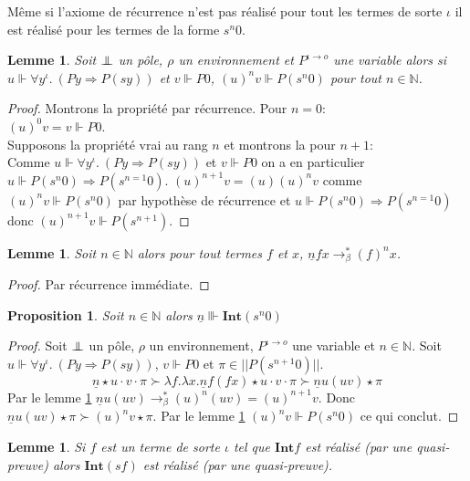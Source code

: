 \documentclass[a4paper,12pt]{article}
\newtheorem{prop}[theo]{Proposition}
\newtheorem{lem}[theo]{Lemme}
\theoremstyle{rmqstyle}
\newcommand{\N}{\mathbb{N}}
\newcommand{\abss}[1]{\lvert \lvert#1\rvert \rvert}
\renewcommand{\int}{\mathbf{Int}}
\renewcommand{\implies}{\Rightarrow}
\newcommand{\rbeta}{\longrightarrow_\beta}
\newcommand{\pole}{{\protect\mathpalette{\protect\polehelper}{\bot}}} \def\polehelper#1#2{\mathrel{\rlap{$#1#2$}\mkern3mu{#1#2}}}
\newcommand{\Kri}[1]{\underline{#1}}
\begin{document}
Même si l'axiome de récurrence n'est pas réalisé pour tout les termes de sorte $\iota$ il est réalisé pour les termes de la forme $s^n 0$. 

\begin{lem}
\label{lem recu}
Soit $\pole$ un pôle, $\rho$ un environnement et $P^{\iota \to o}$ une variable alors si $u \Vdash \forall y^\iota. \ (Py \implies P(sy))$ et $v \Vdash P0$, $(u)^n v \Vdash P(s^n 0)$ pour tout $n \in \N$.
\end{lem}

\begin{proof}
Montrons la propriété par récurrence. Pour $n = 0$:\\
$(u)^0 v = v \Vdash P0$.\\
Supposons la propriété vrai au rang $n$ et montrons la pour $n+1$:\\
Comme $u \Vdash \forall y^\iota. \ (Py \implies P(sy))$ et $v \Vdash P0$ on a en particulier $u \Vdash P(s^n 0) \implies P(s^{n =1} 0)$. $(u)^{n+1} v = (u) (u)^n v$ comme $(u)^n v \Vdash P(s^n 0)$ par hypothèse de récurrence et $u \Vdash P(s^n 0) \implies P(s^{n =1} 0)$ donc $(u)^{n+1} v \Vdash P(s^{n+1})$. 
\end{proof}

\begin{lem}
\label{lem kri}
Soit $n \in \N$ alors pour tout termes $f$ et $x$, $\Kri{n} f x \rbeta^* (f)^n x$.
\end{lem}

\begin{proof}
Par récurrence immédiate.
\end{proof}

\begin{prop}
Soit $n \in \N$ alors $\Kri{n} \Vvdash \int(s^n 0)$
\end{prop}

\begin{proof}
Soit $\pole$ un pôle, $\rho$ un environnement, $P^{\iota \to o}$ une variable et $n \in \N$. Soit $u \Vdash \forall y^\iota. \ (Py \implies P(sy))$, $v \Vdash P0$ et $\pi \in \abss{P(s^{n+1} 0)}$.  
$$\Kri{n} \star u \cdot v \cdot \pi \succ \lambda f. \lambda x. \Kri{n} f (f x) \star u \cdot v \cdot \pi \succ  \Kri{n} u (u v) \star \pi$$
Par le lemme \ref{lem kri} $\Kri{n} u (u v) \rbeta^* (u)^n (u v) = (u)^{n+1} v$. Donc $\Kri{n} u (u v) \star \pi \succ (u)^n v \star \pi$. Par le lemme \ref{lem recu} $(u)^n v \Vdash P(s^n 0)$ ce qui conclut.
\end{proof}

\begin{lem}
\label{lem suc}
Si $f$ est un terme de sorte $\iota$ tel que $\int{f}$ est réalisé (par une quasi-preuve) alors $\int(sf)$ est réalisé (par une quasi-preuve).
\end{lem}
\end{document}
